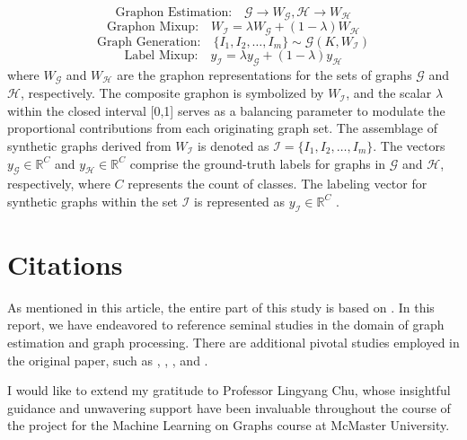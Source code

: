 \documentclass[sigconf, nonacm]{acmart}
\begin{document}
\begin{equation}
\text{Graphon Estimation:} \quad \mathcal{G} \rightarrow W_{\mathcal{G}}, \mathcal{H} \rightarrow W_{\mathcal{H}}
\end{equation}
\begin{equation}
\text{Graphon Mixup:} \quad W_{\mathcal{I}} = \lambda W_{\mathcal{G}} + (1 - \lambda) W_{\mathcal{H}}
\end{equation}
\begin{equation}
\text{Graph Generation:} \quad \{I_1, I_2, \ldots, I_m\} \sim \mathcal{G}(K, W_{\mathcal{I}})
\end{equation}
\begin{equation}
\text{Label Mixup:} \quad y_{\mathcal{I}} = \lambda y_{\mathcal{G}} + (1 - \lambda) y_{\mathcal{H}}
\end{equation}
where $W_{\mathcal{G}}$ and $W_{\mathcal{H}}$ are the graphon representations for the sets of graphs $\mathcal{G}$ and $\mathcal{H}$, respectively. The composite graphon is symbolized by $W_{\mathcal{I}}$, and the scalar $\lambda$ within the closed interval [0,1] serves as a balancing parameter to modulate the proportional contributions from each originating graph set. The assemblage of synthetic graphs derived from $W_{\mathcal{I}}$ is denoted as $\mathcal{I} = \{I_1, I_2, \dots, I_m\}$. The vectors $y_{\mathcal{G}} \in \mathbb{R}^C$ and $y_{\mathcal{H}} \in \mathbb{R}^C$ comprise the ground-truth labels for graphs in $\mathcal{G}$ and $\mathcal{H}$, respectively, where $C$ represents the count of classes. The labeling vector for synthetic graphs within the set $\mathcal{I}$ is represented as $y_{\mathcal{I}} \in \mathbb{R}^C$ \cite{han2022g}.


\section{Citations}

As mentioned in this article, the entire part of this study is based on \cite{han2022g}. In this report, we have endeavored to reference seminal studies in the domain of graph estimation and graph processing. There are additional pivotal studies employed in the original paper, such as \cite{lovasz2012large}, \cite{xu2021learning}, \cite{zhang2017mixup}, and \cite{zhang2020does}.


\begin{acks}
I would like to extend my gratitude to Professor Lingyang Chu, whose insightful guidance and unwavering support have been invaluable throughout the course of the project for the Machine Learning on Graphs course at McMaster University.
\end{acks}




\end{document}
